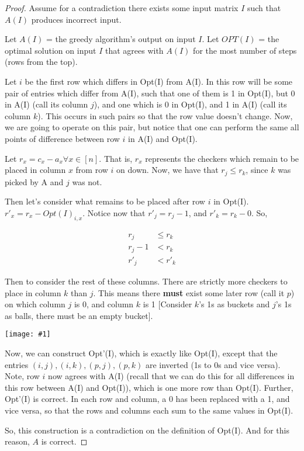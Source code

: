 \documentclass{article}
\providecommand{\image}[1]{
    \begin{center}
        \texttt{[image: \#1]}
    \end{center}
}
\begin{document}
	\begin{proof}
	Assume for a contradiction there exists some input matrix $I$ such that $A(I)$ produces incorrect input.
	
	Let $A(I)$ = the greedy algorithm's output on input $I$.
	Let $OPT(I)$ = the optimal solution on input $I$ that agrees
	with $A(I)$ for the most number of steps (rows from the top).
 	
    Let $i$ be the first row which differs in Opt(I) from A(I).
    In this row will be some pair of entries which differ from A(I), such that one of them is 1 in Opt(I), but 0 in A(I) (call its column $j$), and one which is 0 in Opt(I), and 1 in A(I) (call its column $k$).
    This occurs in such pairs so that the row value doesn't change.
    Now, we are going to operate on this pair, but notice that one can perform the same all points of difference between row $i$ in A(I) and Opt(I).
    
    Let $r_x = c_x - a_x \forall x \in [n]$. That is, $r_x$ represents the checkers which remain to be placed in column $x$ from row $i$ on down.
    Now, we have that $r_j \leq r_k$, since $k$ was picked by A and $j$ was not.
    
    Then let's consider what remains to be placed after row $i$ in Opt(I).
    $r'_x = r_x - Opt(I)_{i, x}$.
    Notice now that $r'_j = r_j - 1$, and $r'_k = r_k - 0$. So,
    
    \begin{align*}
    r_j &\leq r_k\\
    r_j - 1 &< r_k\\
    r'_j &< r'_k
    \end{align*}
    
    Then to consider the rest of these columns.
    There are strictly more checkers to place in column $k$ than $j$.
    This means there \textbf{must} exist some later row (call it $p$) on which column $j$ is 0, and column $k$ is 1 [Consider $k$'s 1s as buckets and $j$'s 1s as balls, there must be an empty bucket].
    
    \image{p12mat}
    
    Now, we can construct Opt'(I), which is exactly like Opt(I), except that the entries $(i, j), (i, k), (p, j), (p, k)$ are inverted (1s to 0s and vice versa).
    Note, row $i$ now agrees with A(I) (recall that we can do this for all differences in this row between A(I) and Opt(I)), which is one more row than Opt(I).
    Further, Opt'(I) is correct.
    In each row and column, a 0 has been replaced with a 1, and vice versa, so that the rows and columns each sum to the same values in Opt(I).
    
    So, this construction is a contradiction on the definition of Opt(I).
    And for this reason, $A$ is correct.
	\end{proof}
\end{document}
